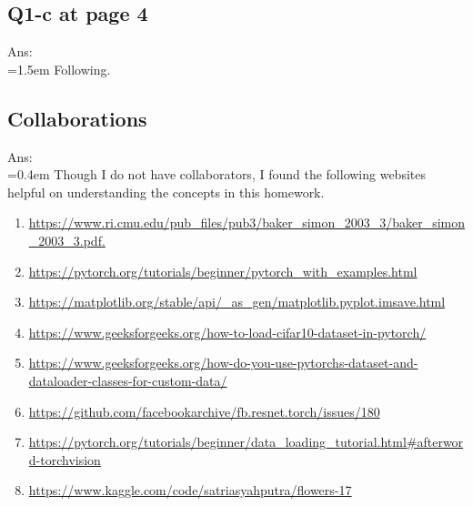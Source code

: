 \documentclass{article}
\begin{document}
	\newpage
	\subsection*{Q1-c at page 4}
	Ans:\\
	\hangindent=1.5em \hspace{1.5em}Following.
	\newline


	\newpage
	\subsection*{Collaborations}
	Ans:\\
	\hangindent=0.4em \hspace{0.3em} Though I do not have collaborators, I found the following websites helpful on understanding the concepts in this homework.
	\begin{enumerate}
		\item \url{https://www.ri.cmu.edu/pub_files/pub3/baker_simon_2003_3/baker_simon_2003_3.pdf.}
		\item \url{https://pytorch.org/tutorials/beginner/pytorch_with_examples.html}
		\item \url{https://matplotlib.org/stable/api/_as_gen/matplotlib.pyplot.imsave.html}	
		\item \url{https://www.geeksforgeeks.org/how-to-load-cifar10-dataset-in-pytorch/}	
		\item \url{https://www.geeksforgeeks.org/how-do-you-use-pytorchs-dataset-and-dataloader-classes-for-custom-data/}
		\item \url{https://github.com/facebookarchive/fb.resnet.torch/issues/180}
		\item \url{https://pytorch.org/tutorials/beginner/data_loading_tutorial.html#afterword-torchvision}
		\item \url{https://www.kaggle.com/code/satriasyahputra/flowers-17}
	\end{enumerate}
\end{document}
